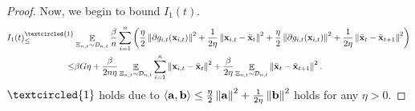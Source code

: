 \documentclass{article}
\begin{document}
\begin{proof}
Now, we begin to bound $I_1(t)$.
\begin{align}
\nonumber
I_1(t) \refabovecir{\le}{\textcircled{1}} & \EE_{ \Xi_{n,t} \sim \Dcal_{n,t} }\frac{\beta}{n}\sum_{i=1}^n \lrincir{ \frac{\eta}{2}\lrnorm{\partial g_{i,t}(\x_{i,t})}^2 + \frac{1}{2\eta}\lrnorm{\x_{i,t} - \bar{\x}_t}^2  + \frac{\eta}{2}\lrnorm{\partial g_{i,t}(\x_{i,t})}^2 + \frac{1}{2\eta}\lrnorm{\bar{\x}_t - \bar{\x}_{t+1}}^2 }\\ \nonumber
\le & \beta G \eta + \frac{\beta}{2n\eta } \EE_{ \Xi_{n,t} \sim \Dcal_{n,t} } \sum_{i=1}^n \lrnorm{\x_{i,t} - \bar{\x}_t}^2 + \frac{\beta }{2\eta }\EE_{ \Xi_{n,t} \sim \Dcal_{n,t} } \lrnorm{\bar{\x}_t - \bar{\x}_{t+1}}^2.
\end{align} $\textcircled{1}$ holds due to $\left\langle{\bf a},{\bf b} \right\rangle \le \frac{\eta}{2}\left\lVert{\bf a}\right\rVert^2 + \frac{1}{2\eta}\left\lVert{\bf b}\right\rVert^2$ holds for any $\eta>0$. 


\end{proof}
\end{document}
